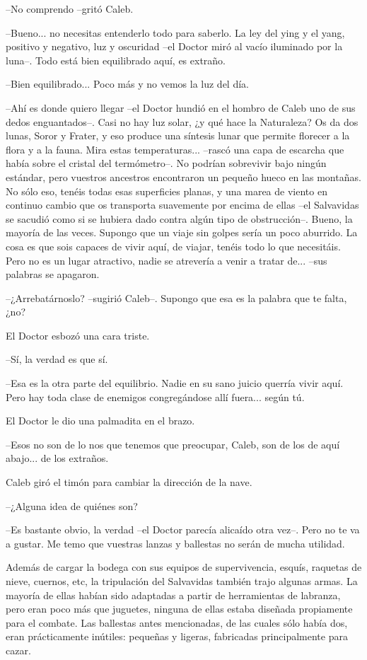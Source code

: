 --No comprendo --gritó Caleb.
 
--Bueno... no necesitas entenderlo todo para saberlo. La ley del ying y el yang, positivo y negativo, luz y oscuridad --el Doctor miró al vacío iluminado por la luna--. Todo está bien equilibrado aquí, es extraño.
 
--Bien equilibrado... Poco más y no vemos la luz del día.
 
--Ahí es donde quiero llegar --el Doctor hundió en el hombro de Caleb uno de sus dedos enguantados--. Casi no hay luz solar, ¿y qué hace la Naturaleza? Os da dos lunas, Soror y Frater, y eso produce una síntesis lunar que permite florecer a la flora y a la fauna. Mira estas temperaturas... --rascó una capa de escarcha que había sobre el cristal del termómetro--. No podrían sobrevivir bajo ningún estándar, pero vuestros ancestros encontraron un pequeño hueco en las montañas. No sólo eso, tenéis todas esas superficies planas, y una marea de viento en continuo cambio que os transporta suavemente por encima de ellas --el Salvavidas se sacudió como si se hubiera dado contra algún tipo de obstrucción--. Bueno, la mayoría de las veces. Supongo que un viaje sin golpes sería un poco aburrido. La cosa es que sois capaces de vivir aquí, de viajar, tenéis todo lo que necesitáis. Pero no es un lugar atractivo, nadie se atrevería a venir a tratar de... --sus palabras se apagaron.
 
--¿Arrebatárnoslo? --sugirió Caleb--. Supongo que esa es la palabra que te falta, ¿no?
 
El Doctor esbozó una cara triste.
 
--Sí, la verdad es que sí.
 
--Esa es la otra parte del equilibrio. Nadie en su sano juicio querría vivir aquí. Pero hay toda clase de enemigos congregándose allí fuera... según tú.
 
El Doctor le dio una palmadita en el brazo.
 
--Esos no son de lo nos que tenemos que preocupar, Caleb, son de los de aquí abajo... de los extraños.
 
Caleb giró el timón para cambiar la dirección de la nave.
 
--¿Alguna idea de quiénes son?
 
--Es bastante obvio, la verdad --el Doctor parecía alicaído otra vez--. Pero no te va a gustar. Me temo que vuestras lanzas y ballestas no serán de mucha utilidad.
 
Además de cargar la bodega con sus equipos de supervivencia, esquís, raquetas de nieve, cuernos, etc, la tripulación del Salvavidas también trajo algunas armas. La mayoría de ellas habían sido adaptadas a partir de herramientas de labranza, pero eran poco más que juguetes, ninguna de ellas estaba diseñada propiamente para el combate. Las ballestas antes mencionadas, de las cuales sólo había dos, eran prácticamente inútiles: pequeñas y ligeras, fabricadas principalmente para cazar.
 
